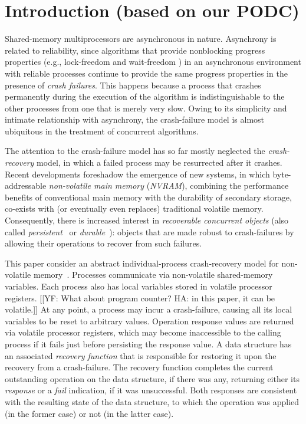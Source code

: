 \section{Introduction (based on our PODC)}

Shared-memory multiprocessors are asynchronous in nature.
Asynchrony is related to reliability,
since algorithms that provide nonblocking progress properties
(e.g., lock-freedom and wait-freedom \cite{herlihy91waitfree})
in an asynchronous environment with reliable processes
continue to provide the same progress properties in the presence
of \emph{crash failures}.
This happens because a process that crashes
permanently during the execution of the algorithm is indistinguishable
to the other processes from one that is merely very slow.
Owing to its simplicity and intimate relationship with asynchrony,
the crash-failure model is almost ubiquitous in the treatment of
concurrent algorithms.

The attention to the crash-failure model has so far mostly neglected
the \emph{crash-recovery} model, in which a failed process may be
resurrected after it crashes.
Recent developments foreshadow the emergence of new systems,
in which byte-addressable \emph{non-volatile main memory} (\emph{NVRAM}),
combining the performance benefits of conventional main memory
with the durability of secondary storage,
co-exists with (or eventually even replaces) traditional volatile memory.
Consequently, there is increased interest in \emph{recoverable concurrent
objects} (also called
\emph{persistent}~\cite{CoburnCAGGJW-Asplos2011,ChenQ-VLDB2015}
or \emph{durable}~\cite{VenkataramanTRC-FAST2011}):
objects that are made robust to crash-failures by allowing their operations
to recover from such failures.

This paper consider an abstract individual-process crash-recovery model
for non-volatile memory~\cite{AttiyaBH-PODC2018}.
Processes communicate via non-volatile shared-memory variables.
Each process also has local variables stored in volatile processor registers.
[[YF: What about program counter? HA: in this paper, it can be volatile.]]
At any point, a process may incur a crash-failure,
causing all its local variables to be reset to arbitrary values.
Operation response values are returned via volatile processor registers,
which may become inaccessible to the calling process if it fails
just before persisting the response value.
A data structure has an associated \emph{recovery function} that is 
responsible for restoring it upon the recovery from a crash-failure.
The recovery function completes the current outstanding operation on 
the data structure, if there was any, returning either its \emph{response}
or a \emph{fail} indication, if it was unsuccessful. 
Both responses are consistent with the resulting state of the data structure,
to which the operation was applied (in the former case) 
or not (in the latter case).

